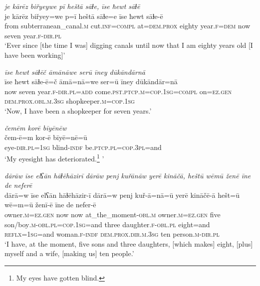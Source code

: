 \ea \label{ŽM.7}
\textit{je kārēz biřyeywe pī heštā sāɫe, īse ħewt sāɫē} \\ 
\gll je kārēz biřyey=we p=ī heštā sāɫe=e īse ħewt sāɫe-ē \\ 
 from subterranean\_canal\textsc{.m} cut\textsc{.inf}\textsc{=compl} at=\textsc{dem.prox} eighty year\textsc{.f}\textsc{=dem} now seven year\textsc{.f}\textsc{-dir}\textsc{.pl} \\ 
\glt `Ever since [the time I was] digging canals until now that I am eighty years old [I have been working]'
\z 
 
\ea \label{ŽM.8}
\textit{īse ħewt sāɫēč āmānāwe serū īney dūkāndārnā} \\ 
\gll īse ħewt sāɫe-ē=č āmā=nā=we ser=ū īney dūkāndār=nā \\ 
 now seven year\textsc{.f}\textsc{-dir}\textsc{.pl}\textsc{=add} come\textsc{.pst}\textsc{.ptcp}\textsc{.m}\textsc{=cop}\textsc{.\textsc{1sg}}\textsc{=compl} on\textsc{=ez.gen} \textsc{dem.prox}\textsc{.obl}\textsc{.m}\textsc{.3sg} shopkeeper\textsc{.m}\textsc{=cop}\textsc{.\textsc{1sg}} \\ 
\glt `Now, I have been a shopkeeper for seven years.'
\z 
 
\ea \label{ŽM.11}
\textit{čemēm korē bīyēnēw} \\ 
\gll čem-ē=m kor-ē bīyē=nē=ū \\ 
 eye\textsc{-dir}\textsc{.pl}\textsc{=\textsc{1sg}} blind\textsc{-indf} be\textsc{.ptcp}\textsc{.pl}\textsc{=cop}\textsc{.3pl}=and \\ 
\glt `My eyesight has deteriorated.\footnote{My eyes have gotten blind.} '
\z 
 
\ea \label{ŽM.16}
\textit{dārāw īse elʕān hāɫēhāzirī dārāw penj kuřānāw yerē kināčā, heštū wēmū ženē īne de neferē} \\ 
\gll dārā=w īse elʕān hāɫēhāzir-ī dārā=w penj kuř-ā=nā=ū yerē kināčē-ā hešt=ū wē=m=ū ženī-ē īne de nefer-ē \\ 
 owner\textsc{.m}\textsc{=ez.gen} now now at\_the\_moment\textsc{-obl}\textsc{.m} owner\textsc{.m}\textsc{=ez.gen} five son/boy\textsc{.m}\textsc{-obl}\textsc{.pl}\textsc{=cop}\textsc{.\textsc{1sg}}=and three daughter\textsc{.f}\textsc{-obl}\textsc{.pl} eight=and \textsc{reflx}\textsc{=\textsc{1sg}}=and woman\textsc{.f}\textsc{-indf} \textsc{dem.prox}\textsc{.dir}\textsc{.m}\textsc{.3sg} ten person\textsc{.m}\textsc{-dir}\textsc{.pl} \\ 
\glt `I have, at the moment, five sons and three daughters, [which makes] eight, [plus] myself and a wife, [making us] ten people.'
\z 
 
